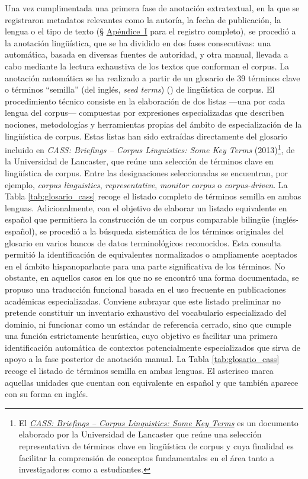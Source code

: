 Una vez cumplimentada una primera fase de anotación extratextual, en la que se registraron metadatos relevantes como la autoría, la fecha de publicación, la lengua o el tipo de texto (§ \hyperref[appendix:registro]{Apéndice~I} para el registro completo), se procedió a la anotación lingüística, que se ha dividido en dos fases consecutivas: una automática, basada en diversas fuentes de autoridad, y otra manual, llevada a cabo mediante la lectura exhaustiva de los textos que conforman el corpus. La anotación automática se ha realizado a partir de un glosario de 39 términos clave o términos ``semilla'' (del inglés, {\textit{seed terms}}) (\cite{heylen2015automatic}) de lingüística de corpus. El procedimiento técnico consiste en la elaboración de dos listas —una por cada lengua del corpus— compuestas por expresiones especializadas que describen nociones, metodologías y herramientas propias del ámbito de especialización de la lingüística de corpus. Estas listas han sido extraídas directamente del glosario incluido en \emph{CASS: Briefings – Corpus Linguistics: Some Key Terms} (2013)\footnote{El \href{https://cass.lancs.ac.uk/wp-content/uploads/2013/12/CASS-Gloss-final1.pdf}
{\textit{CASS: Briefings – Corpus Linguistics: Some Key Terms}} es un documento elaborado por la Universidad de Lancaster que reúne una selección representativa de términos clave en lingüística de corpus y cuya finalidad es facilitar la comprensión de conceptos fundamentales en el área tanto a investigadores como a estudiantes.}, de la Universidad de Lancaster, que reúne una selección de términos clave en lingüística de corpus. Entre las designaciones seleccionadas se encuentran, por ejemplo, \textit{corpus linguistics}, \textit{representative}, \textit{monitor corpus} o \textit{corpus-driven}. 
La Tabla \ref{tab:glosario_cass} recoge el listado completo de términos semilla en ambas lenguas. Adicionalmente, con el objetivo de elaborar un listado equivalente en español que permitiera la construcción de un corpus comparable bilingüe (inglés-español), se procedió a la búsqueda sistemática de los términos originales del glosario en varios bancos de datos terminológicos reconocidos. Esta consulta permitió la identificación de equivalentes normalizados o ampliamente aceptados en el ámbito hispanoparlante para una parte significativa de los términos. No obstante, en aquellos casos en los que no se encontró una forma documentada, se propuso una traducción funcional basada en el uso frecuente en publicaciones académicas especializadas. Conviene subrayar que este listado preliminar no pretende constituir un inventario exhaustivo del vocabulario especializado del dominio, ni funcionar como un estándar de referencia cerrado, sino que cumple una función estrictamente heurística, cuyo objetivo es facilitar una primera identificación automática de contextos potencialmente especializados que sirva de apoyo a la fase posterior de anotación manual. La Tabla \ref{tab:glosario_cass} recoge el listado de términos semilla en ambas lenguas. El asterisco marca aquellas unidades que cuentan con equivalente en español y que también aparece con su forma en inglés.

